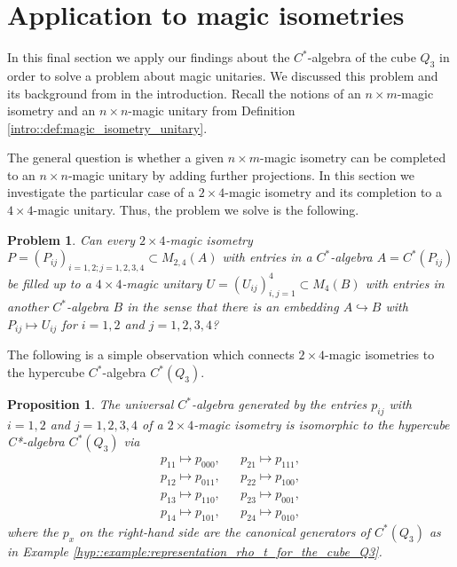 \documentclass[a4paper]{amsart}
\newtheorem{proposition}[thm]{Proposition}
\newtheorem{problem}[thm]{Problem}
\begin{document}
\section{Application to magic isometries}
\label{sec::application_to_magic_isometries}

In this final section we apply our findings about the $C^\ast$-algebra of the cube $Q_3$ in order to solve a problem about magic unitaries. We discussed this problem and its background from \cite[Section 5]{banica_noncommutative_2012} in the introduction. Recall the notions of an $n \times m$-magic isometry and an $n \times n$-magic unitary from Definition \ref{intro::def:magic_isometry_unitary}. 

The general question is whether a given $n \times m$-magic isometry can be completed to an $n \times n$-magic unitary by adding further projections. In this section we investigate the particular case of a $2 \times 4$-magic isometry and its completion to a $4 \times 4$-magic unitary. Thus, the problem we solve is the following.

\begin{problem}
    \label{app::problem:2x4_quantum_sudoku_fill_up}
    Can every $2 \times 4$-magic isometry $P = (P_{ij})_{i=1,2; j=1,2,3,4} \subset M_{2,4}(A)$ with entries in a $C^\ast$-algebra $A = C^\ast(P_{ij})$ be filled up to a $4 \times 4$-magic unitary $U = (U_{ij})_{i,j=1}^4 \subset M_4(B)$ with entries in another $C^\ast$-algebra $B$ in the sense that there is an embedding $A \hookrightarrow B$ with $P_{ij} \mapsto U_{ij}$ for $i=1,2$ and $j=1,2,3,4$?
\end{problem}

The following is a simple observation which connects $2 \times 4$-magic isometries to the hypercube $C^\ast$-algebra $C^\ast(Q_3)$.

\begin{proposition}
    \label{app::prop:2x4_magic_isometry_as_hypercube_algebra}
    The universal $C^\ast$-algebra generated by the entries $p_{ij}$ with $i=1,2$ and $j=1,2,3,4$ of a $2 \times 4$-magic isometry is isomorphic to the hypercube C*-algebra $C^\ast(Q_3)$ via
    \begin{align*}
        p_{11} \mapsto p_{000}, & & p_{21} \mapsto p_{111}, \\
        p_{12} \mapsto p_{011}, & & p_{22} \mapsto p_{100}, \\
        p_{13} \mapsto p_{110}, & & p_{23} \mapsto p_{001}, \\
        p_{14} \mapsto p_{101}, & & p_{24} \mapsto p_{010},
    \end{align*}
    where the $p_x$ on the right-hand side are the canonical generators of $C^\ast(Q_3)$ as in Example \ref{hyp::example:representation_rho_t_for_the_cube_Q3}.
\end{proposition}
\end{document}
